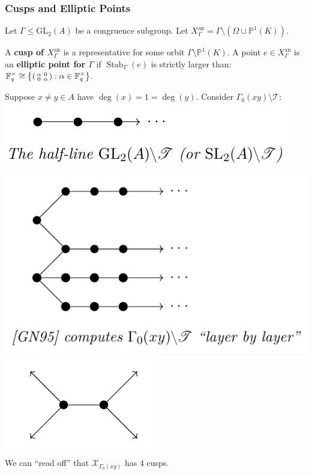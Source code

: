 \documentclass[handout]{beamer}
\numberwithin{equation}{section}
\numberwithin{case}{theorem}
\newcommand{\sT}{\mathscr{T}}		%
\newcommand{\sX}{\mathscr{X}}		%
\newcommand{\bbF}{\mathbb{F}}		%
\newcommand{\bbP}{\mathbb{P}}		%
\newcommand{\GL}{\mathrm{GL}} 	%
\newcommand{\<}{\left\langle}
\renewcommand{\>}{\right\rangle}
\begin{document}
	\begin{frame}
		\frametitle{Cusps and Elliptic Points}
		Let $\Gamma\leq \GL_2(A)$ be a congruence subgroup. Let $X_{\Gamma}^{\text{an}}=\Gamma\setminus(\Omega\cup\bbP^1(K)).$ \pause
		
		\begin{definition}\label{d: elliptic pt}
			A \textbf{cusp of $X_{\Gamma}^{\text{an}}$} is a representative for some orbit $\Gamma\setminus\bbP^1(K).$ \pause A point $e\in X_{\Gamma}^{\text{an}}$ is an \textbf{elliptic point for $\Gamma$} if $\operatorname{Stab}_{\Gamma}(e)$ is strictly larger than: $\displaystyle{\bbF_q^{\times}\cong\left\{\begin{psmallmatrix}\alpha&0\\0&\alpha\end{psmallmatrix}:\alpha\in \bbF_q^{\times}\right\}}.$ 
		\end{definition}
		
		\pause
		
		\begin{example}
			Suppose $x\neq y\in A$ have $\deg(x)=1=\deg(y).$ Consider $\Gamma_0(xy)\setminus\sT$:\\
			\includegraphics[scale=0.5]{halfline.png}
			\includegraphics[scale=0.5]{layers.png}
			\includegraphics[scale=0.5]{quotient.png}\\
			We can ``read off'' that $\sX_{\Gamma_0(xy)}$ has $4$ cusps.
		\end{example}
	\end{frame}	
	
\end{document}
